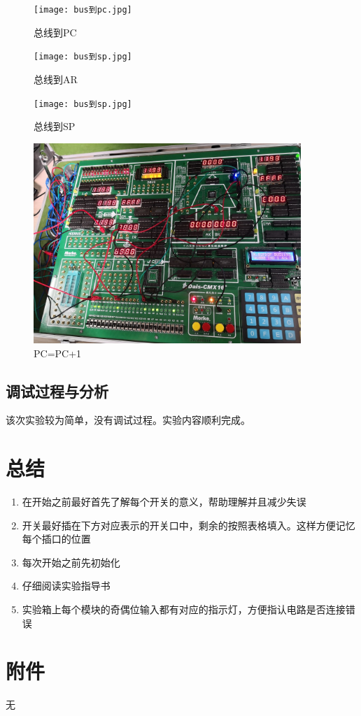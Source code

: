 \documentclass[a4paper,10pt,UTF8]{paper}
\numberwithin{equation}{section}
\numberwithin{figure}{section}
\begin{document}
\begin{figure}[h]
  \centering
  \texttt{[image: bus到pc.jpg]}
  \caption{总线到PC}
  \label{fig:6}
\end{figure}

\begin{figure}[h]
  \centering
  \texttt{[image: bus到sp.jpg]}
  \caption{总线到AR}
  \label{fig:7}
\end{figure}

\begin{figure}[h]
  \centering
  \texttt{[image: bus到sp.jpg]}
  \caption{总线到SP}
  \label{fig:8}
\end{figure}

\begin{figure}[h]
  \centering
  \includegraphics[width=0.9\textwidth]{pc+1.jpg}
  \caption{PC=PC+1}
  \label{fig:9}
\end{figure}


\subsection{调试过程与分析}

该次实验较为简单，没有调试过程。实验内容顺利完成。

\section{总结}

\begin{enumerate}
  \item 在开始之前最好首先了解每个开关的意义，帮助理解并且减少失误
  \item 开关最好插在下方对应表示的开关口中，剩余的按照表格填入。这样方便记忆每个插口的位置
  \item 每次开始之前先初始化
  \item 仔细阅读实验指导书
  \item 实验箱上每个模块的奇偶位输入都有对应的指示灯，方便指认电路是否连接错误
\end{enumerate}{}

\section{附件}

无
\end{document}
